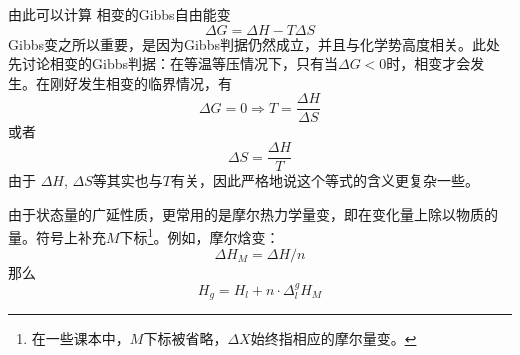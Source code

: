 由此可以计算 相变的Gibbs自由能变
$$
\Delta G = \Delta H - T \Delta S
$$
Gibbs变之所以重要，是因为Gibbs判据仍然成立，并且与化学势高度相关。此处先讨论相变的Gibbs判据：在等温等压情况下，只有当$\Delta G<0$时，相变才会发生。在刚好发生相变的临界情况，有
$$
\Delta G = 0 \Rightarrow T = \frac{\Delta H}{\Delta S}
$$
或者
$$
\Delta S = \frac{\Delta H}{T}
$$
由于 $\Delta H$, $\Delta S$等其实也与$T$有关，因此严格地说这个等式的含义更复杂一些。

由于状态量的广延性质，更常用的是摩尔热力学量变，即在变化量上除以物质的量。符号上补充$M$下标\footnote{在一些课本中，$M$下标被省略，$\Delta X$始终指相应的摩尔量变。}。例如，摩尔焓变：
$$
\Delta H_M = \Delta H / n
$$
那么
$$
H_g = H_l + n \cdot \Delta^g_l H_M
$$
